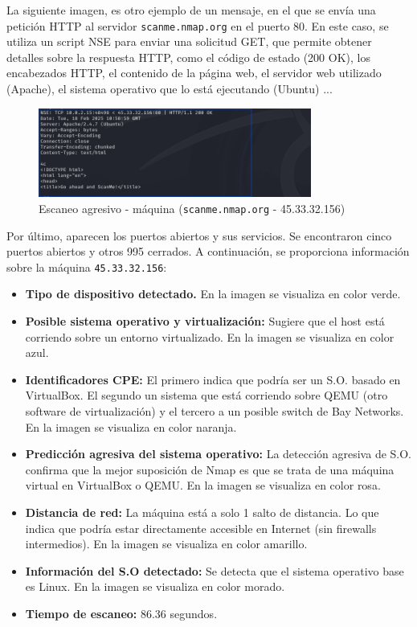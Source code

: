 \documentclass[a4paper,12pt]{article} %
\begin{document}
    La siguiente imagen, es otro ejemplo de un mensaje, en el que se envía una petición HTTP al servidor \texttt{scanme.nmap.org} en el puerto 80. En este caso, se utiliza un script NSE para enviar una solicitud GET, que permite obtener detalles sobre la respuesta HTTP, como el código de estado (200 OK), los encabezados HTTP, el contenido de la página web, el servidor web utilizado (Apache), el sistema operativo que lo está ejecutando (Ubuntu) ...
    
    
        \begin{figure} [hp!]
         \centering
         \includegraphics[width=0.8\textwidth]{Imagenes/NSESCANME.png}
         \caption{Escaneo agresivo - máquina (\texttt{scanme.nmap.org} - 45.33.32.156) }
         \label{fig:wireshark2}
        \end{figure}

    Por último, aparecen los puertos abiertos y sus servicios. Se encontraron cinco puertos abiertos y otros 995 cerrados.  A continuación, se proporciona información sobre la máquina \texttt{45.33.32.156}:
    \begin{itemize}
        \item \textbf{Tipo de dispositivo detectado.} En la imagen se visualiza en color verde.
        \item \textbf{Posible sistema operativo y virtualización: } Sugiere que el host está corriendo sobre un entorno virtualizado. En la imagen se visualiza en color azul.
        \item \textbf{Identificadores CPE: } El primero indica que podría ser un S.O. basado en VirtualBox. El segundo un sistema que está corriendo sobre QEMU (otro software de virtualización) y el tercero a un posible switch de Bay Networks. En la imagen se visualiza en color naranja.
        \item \textbf{Predicción agresiva del sistema operativo: }La detección agresiva de S.O. confirma que la mejor suposición de Nmap es que se trata de una máquina virtual en VirtualBox o QEMU. En la imagen se visualiza en color rosa.
        \item \textbf{Distancia de red: } La máquina está a solo 1 salto de distancia. Lo que indica que podría estar directamente accesible en Internet (sin firewalls intermedios). En la imagen se visualiza en color amarillo.
        \item \textbf{Información del S.O detectado: } Se detecta que el sistema operativo base es Linux. En la imagen se visualiza en color morado.
         \item \textbf{Tiempo de escaneo: } 86.36 segundos.
    \end{itemize}
\end{document}
